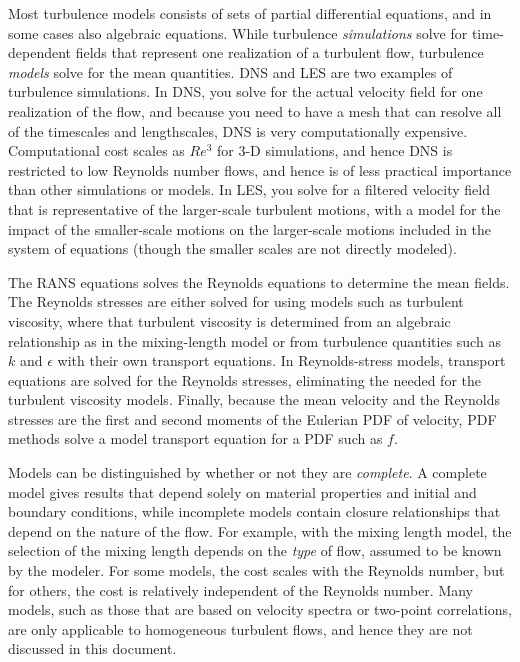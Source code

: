 \documentclass[10pt]{article}
\begin{document}
\begin{flushleft}
Most turbulence models consists of sets of partial differential equations, and in some cases also algebraic equations. While turbulence \textit{simulations} solve for time-dependent fields that represent one realization of a turbulent flow, turbulence \textit{models} solve for the mean quantities. DNS and LES are two examples of turbulence simulations. In DNS, you solve for the actual velocity field for one realization of the flow, and because you need to have a mesh that can resolve all of the timescales and lengthscales, DNS is very computationally expensive. Computational cost scales as \(Re^3\) for 3-D simulations, and hence DNS is restricted to low Reynolds number flows, and hence is of less practical importance than other simulations or models. In LES, you solve for a filtered velocity field that is representative of the larger-scale turbulent motions, with a model for the impact of the smaller-scale motions on the larger-scale motions included in the system of equations (though the smaller scales are not directly modeled). 

The RANS equations solves the Reynolds equations to determine the mean fields. The Reynolds stresses are either solved for using models such as turbulent viscosity, where that turbulent viscosity is determined from an algebraic relationship as in the mixing-length model or from turbulence quantities such as \(k\) and \(\epsilon\) with their own transport equations. In Reynolds-stress models, transport equations are solved for the Reynolds stresses, eliminating the needed for the turbulent viscosity models. Finally, because the mean velocity and the Reynolds stresses are the first and second moments of the Eulerian PDF of velocity, PDF methods solve a model transport equation for a PDF such as \(f\). 

Models can be distinguished by whether or not they are \textit{complete}. A complete model gives results that depend solely on material properties and initial and boundary conditions, while incomplete models contain closure relationships that depend on the nature of the flow. For example, with the mixing length model, the selection of the mixing length depends on the \textit{type} of flow, assumed to be known by the modeler. For some models, the cost scales with the Reynolds number, but for others, the cost is relatively independent of the Reynolds number. Many models, such as those that are based on velocity spectra or two-point correlations, are only applicable to homogeneous turbulent flows, and hence they are not discussed in this document. 





\end{flushleft}
\end{document}
